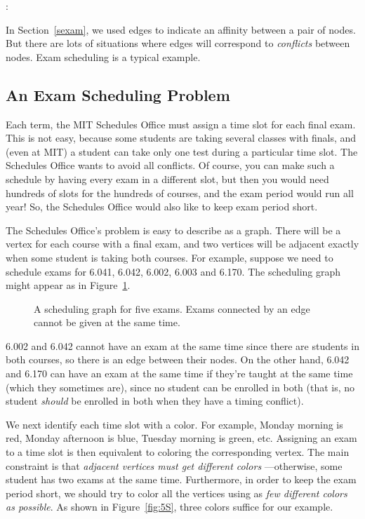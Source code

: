 \begin{editingnotes}
:
\end{editingnotes}

In Section~\ref{sexam}, we used edges to indicate an affinity between a
pair of nodes.  But there are lots of situations where edges will
correspond to \emph{conflicts} between nodes.  Exam scheduling is a
typical example.

\subsection{An Exam Scheduling Problem}

Each term, the MIT Schedules Office must assign a time slot for each
final exam.  This is not easy, because some students are taking
several classes with finals, and (even at MIT) a student can take only
one test during a particular time slot.  The Schedules Office wants to
avoid all conflicts.  Of course, you can make such a schedule by
having every exam in a different slot, but then you would need
hundreds of slots for the hundreds of courses, and the exam period
would run all year!  So, the Schedules Office would also like to keep
exam period short.

The Schedules Office's problem is easy to describe as a graph.  There
will be a vertex for each course with a final exam, and two vertices
will be adjacent exactly when some student is taking both courses.
For example, suppose we need to schedule exams for 6.041, 6.042,
6.002, 6.003 and 6.170.  The scheduling graph might appear as in
Figure~\ref{fig:5R}.

\begin{figure}


\caption{A scheduling graph for five exams.  Exams connected by an
  edge cannot be given at the same time.}

\label{fig:5R}

\end{figure}

6.002 and 6.042 cannot have an exam at the same time since there are
students in both courses, so there is an edge between their nodes.  On the
other hand, 6.042 and 6.170 can have an exam at the same time if they're
taught at the same time (which they sometimes are), since no student can
be enrolled in both (that is, no student \emph{should} be enrolled in both
when they have a timing conflict).

We next identify each time slot with a color.  For example, Monday
morning is red, Monday afternoon is blue, Tuesday morning is green,
etc.  Assigning an exam to a time slot is then equivalent to coloring
the corresponding vertex.  The main constraint is that \emph{adjacent
  vertices must get different colors} ---otherwise, some student has
two exams at the same time.  Furthermore, in order to keep the exam
period short, we should try to color all the vertices using as
\emph{few different colors as possible}.  As shown in Figure~\ref{fig:5S},
three colors suffice for our example.

